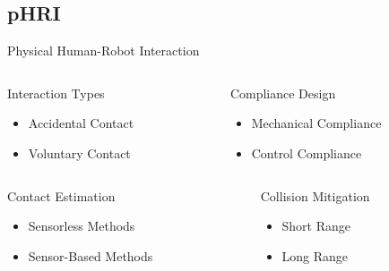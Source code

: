 \documentclass{beamer}
\begin{document}
\subsection{pHRI}
\begin{frame}{Physical Human-Robot Interaction}

\begin{columns}
\begin{column}{0.5\textwidth}
\begin{block}{Interaction Types}
\begin{itemize}
\item Accidental Contact
\item Voluntary Contact
\end{itemize}
\end{block}
\end{column}

\begin{column}{0.5\textwidth}
\begin{block}{Compliance Design}
\begin{itemize}
\item Mechanical Compliance
\item Control Compliance
\end{itemize}
\end{block}
\end{column}
\end{columns}

\vspace{3mm}

\begin{columns}
\begin{column}{0.5\textwidth}
\begin{block}{Contact Estimation}
\begin{itemize}
\item Sensorless Methods
\item Sensor-Based Methods
\end{itemize}
\end{block}
\end{column}

\begin{column}{0.5\textwidth}
\begin{block}{Collision Mitigation}
\begin{itemize}
\item Short Range
\item Long Range
\end{itemize}
\end{block}
\end{column}
\end{columns}

\end{frame}
\end{document}
